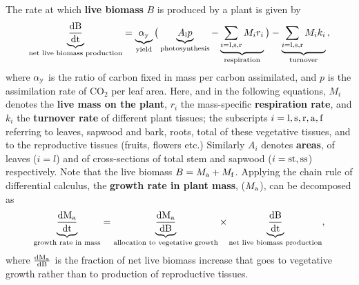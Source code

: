 \documentclass[a4paper,11pt]{article}
\begin{document}
The rate at which \textbf{live biomass} $B$ is produced by a plant is given by
\begin{equation}\label{eq:eq0}
\underbrace{\frac{\rm{d} B}{\rm{d} t}}_{\text{net live biomass production}} = \underbrace{\alpha_{\rm y}}_{\text{yield}}  \big(\underbrace{A_{\rm l} p}_{\text{photosynthesis}} - \underbrace{\sum_{i = {\rm l,s,r}} M_{i} r_{i}}_{\text{respiration}}\big) - \underbrace{ \sum_{i = \rm{l,s,r}} M_{i} k_{i}}_{\text{turnover}} \, ,
\end{equation}
where $\alpha_{\rm y}$ is the ratio of carbon fixed in mass per carbon assimilated, and $p$ is the assimilation rate of CO$_{2}$ per leaf area. Here, and in the following equations, $M_i$ denotes the \textbf{live mass on the plant}, $r_i$ the mass-specific \textbf{respiration rate}, and $k_i$ the \textbf{turnover rate} of different plant tissues; the subscripts $i = \rm{l,s,r,a,f}$ referring to leaves, sapwood and bark, roots, total of these vegetative tissues, and to the reproductive tissues (fruits, flowers etc.)  Similarly $A_i$ denotes \textbf{areas}, of leaves ($i = l$) and of cross-sections of total stem and sapwood ($i =\rm{st,ss}$) respectively. Note that the live biomass $B = M_{\rm a} + M_{\rm f}$.  Applying the chain rule of differential calculus, the \textbf{growth rate in plant mass}, ($M_{\rm a} $), can be decomposed as
\begin{equation}\label{eq:eq1}
\underbrace{{\frac{\rm{d} M_{\rm a} }{\rm{d} t}}}_{\text{growth rate in mass}} = \underbrace{\frac{\rm{d} M_{\rm a} }{\rm{d} B}}_{\text{allocation to vegetative growth}}  \times \underbrace{\frac{\rm{d} B}{\rm{d} t}}_{\text{net live biomass production}},
\end{equation}
where $\frac{\rm{d} M_{\rm a} }{\rm{d} B}$ is the fraction of net live biomass increase that goes to vegetative growth rather than to production of reproductive tissues.
\end{document}
